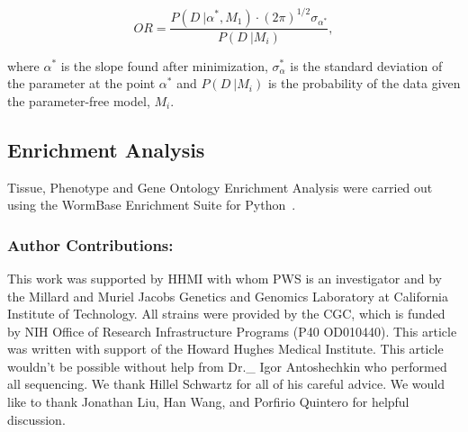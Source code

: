 \begin{equation}
  OR = \frac{
  P(D~|\alpha^*, M_1)\cdot (2\pi)^{1/2}\sigma_{\alpha^*} %
  }{P(D~| M_i)}, %
\end{equation}

where $\alpha^*$ is the slope found after minimization, $\sigma_\alpha^*$ is the
standard deviation of the parameter at the point $\alpha^*$ and $P(D~|M_i)$ is the
probability of the data given the parameter-free model, $M_i$.

\subsection*{Enrichment Analysis}
Tissue, Phenotype and Gene Ontology Enrichment Analysis were carried out using
the WormBase Enrichment Suite for Python~\citep{Angeles-Albores2016b,
Angeles-Albores2016}.



\subsubsection*{Author Contributions:}
This work was supported by HHMI with whom PWS is an investigator
and by the Millard and Muriel Jacobs Genetics and Genomics Laboratory at
California Institute of Technology.
All strains were provided by the CGC, which is funded by NIH Office of Research
Infrastructure Programs (P40 OD010440).
This article was written with support of the Howard Hughes Medical Institute.
This article wouldn't be possible without help from Dr.\_ Igor Antoshechkin who
performed all sequencing.
We thank Hillel Schwartz for all of his careful advice.
We would like to thank Jonathan Liu, Han Wang, and Porfirio Quintero for helpful
discussion.
